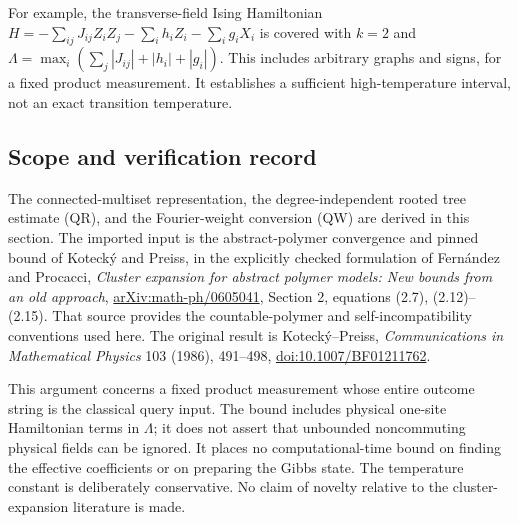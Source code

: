 For example, the transverse-field Ising Hamiltonian
$H=-\sum_{ij}J_{ij}Z_iZ_j-\sum_i h_iZ_i-\sum_i g_iX_i$ is covered
with $k=2$ and
$\Lambda=\max_i(\sum_j|J_{ij}|+|h_i|+|g_i|)$.
This includes arbitrary graphs and signs, for a fixed product
measurement. It establishes a sufficient high-temperature interval,
not an exact transition temperature.

\subsection{Scope and verification record}
\label{quantum-clusters:provenance}

The connected-multiset representation, the degree-independent rooted
tree estimate (QR), and the Fourier-weight conversion (QW) are derived
in this section.  The imported input is the abstract-polymer convergence
and pinned bound of Koteck\'y and Preiss, in the explicitly checked
formulation of Fern\'andez and Procacci,
\emph{Cluster expansion for abstract polymer models: New bounds from an
old approach},
\href{https://arxiv.org/abs/math-ph/0605041}{arXiv:math-ph/0605041},
Section 2, equations (2.7), (2.12)--(2.15).  That source provides the
countable-polymer and self-incompatibility conventions used here.
The original result is Koteck\'y--Preiss,
\emph{Communications in Mathematical Physics} 103 (1986), 491--498,
\href{https://doi.org/10.1007/BF01211762}{doi:10.1007/BF01211762}.

This argument concerns a fixed product measurement whose entire outcome
string is the classical query input.  The bound includes physical
one-site Hamiltonian terms in \(\Lambda\); it does not assert that
unbounded noncommuting physical fields can be ignored.  It places no
computational-time bound on finding the effective coefficients or on
preparing the Gibbs state.  The temperature constant is deliberately
conservative.  No claim of novelty relative to the cluster-expansion
literature is made.

